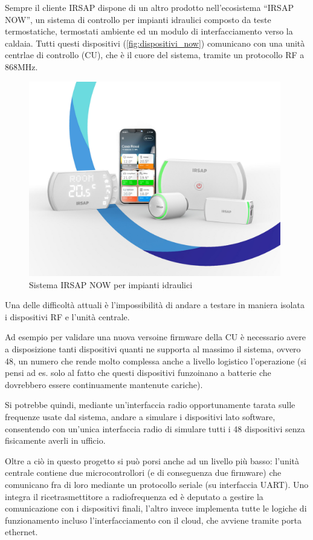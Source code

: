 \documentclass[12pt,a4paper,twoside,titlepage]{book}
\begin{document}
Sempre il cliente IRSAP dispone di un altro prodotto nell'ecosistema ``IRSAP NOW'',
un sistema di controllo per impianti idraulici composto da teste termostatiche,
termostati ambiente ed un modulo di interfacciamento verso la caldaia. Tutti questi
dispositivi (\autoref{fig:dispositivi_now}) comunicano con una unità centrlae di controllo
(CU), che è il cuore del sistema, tramite un protocollo RF a 868MHz.

\begin{figure}[h]
    \centering
    \includegraphics[width=11cm]{img/now.jpeg}
    \caption{Sistema IRSAP NOW per impianti idraulici}
    \label{fig:dispositivi_now}
\end{figure}

Una delle difficoltà attuali è l'impossibilità di andare a testare in maniera isolata i
dispositivi RF e l'unità centrale.

Ad esempio per validare una nuova versoine firmware della CU è necessario avere a disposizione tanti dispositivi quanti
ne supporta al massimo il sistema, ovvero 48, un numero che rende molto complessa anche a
livello logistico l'operazione (si pensi ad es. solo al fatto che questi dispositivi funzoinano a
batterie che dovrebbero essere continuamente mantenute cariche).

Si potrebbe quindi, mediante un'interfaccia radio opportunamente tarata sulle frequenze usate
dal sistema, andare a simulare i dispositivi lato software, consentendo con un'unica interfaccia
radio di simulare tutti i 48 dispositivi senza fisicamente averli in ufficio.

Oltre a ciò in questo progetto si può porsi anche ad un livello più basso: l'unità
centrale contiene due microcontrollori (e di conseguenza due firmware) che comunicano fra di
loro mediante un protocollo seriale (su interfaccia UART). Uno integra il ricetrasmettitore
a radiofrequenza ed è deputato a gestire la comunicazione con i dispositivi
finali, l'altro invece implementa tutte le logiche di funzionamento incluso l'interfacciamento
con il cloud, che avviene tramite porta ethernet.
\end{document}
